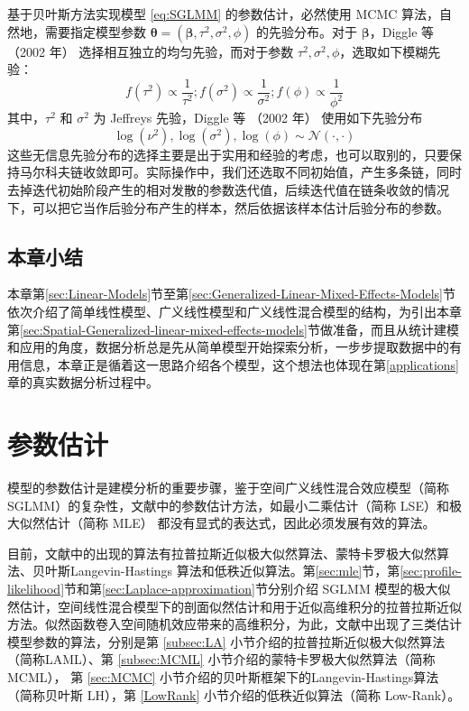 \documentclass[12pt,a4paper,UTF8,twoside]{book}
\theoremstyle{definition}
\theoremstyle{definition}
\theoremstyle{definition}
\theoremstyle{remark}
\begin{document}
基于贝叶斯方法实现模型 \eqref{eq:SGLMM} 的参数估计，必然使用 MCMC 算法，自然地，需要指定模型参数 \(\boldsymbol{\theta} = (\boldsymbol{\beta},\tau^2,\sigma^2,\phi)\) 的先验分布。对于 \(\boldsymbol{\beta}\)，Diggle 等 （2002 年） \citep{Diggle2002Childhood} 选择相互独立的均匀先验，而对于参数 \(\tau^2,\sigma^2,\phi\)，选取如下模糊先验：
\[f(\tau^2) \propto \frac{1}{\tau^2};f(\sigma^2) \propto \frac{1}{\sigma^2};f(\phi) \propto \frac{1}{\phi^2}\]
\noindent 其中，\(\tau^2\) 和 \(\sigma^2\) 为 Jeffreys 先验，Diggle 等 （2002 年） \citep{Diggle2002Childhood} 使用如下先验分布
\begin{equation*}
\log(\nu^2),\log(\sigma^2),\log(\phi)  \sim \mathcal{N}(\cdot,\cdot)
\end{equation*}
这些无信息先验分布的选择主要是出于实用和经验的考虑，也可以取别的，只要保持马尔科夫链收敛即可。实际操作中，我们还选取不同初始值，产生多条链，同时去掉迭代初始阶段产生的相对发散的参数迭代值，后续迭代值在链条收敛的情况下，可以把它当作后验分布产生的样本，然后依据该样本估计后验分布的参数。

\hypertarget{sec:models}{%
\section{本章小结}\label{sec:models}}

本章第\ref{sec:Linear-Models}节至第\ref{sec:Generalized-Linear-Mixed-Effects-Models}节依次介绍了简单线性模型、广义线性模型和广义线性混合模型的结构，为引出本章第\ref{sec:Spatial-Generalized-linear-mixed-effects-models}节做准备，而且从统计建模和应用的角度，数据分析总是先从简单模型开始探索分析，一步步提取数据中的有用信息，本章正是循着这一思路介绍各个模型，这个想法也体现在第\ref{applications}章的真实数据分析过程中。

\hypertarget{algorithms}{%
\chapter{参数估计}\label{algorithms}}

模型的参数估计是建模分析的重要步骤，鉴于空间广义线性混合效应模型（简称 SGLMM）的复杂性，文献中的参数估计方法，如最小二乘估计（简称 LSE）和极大似然估计（简称 MLE） 都没有显式的表达式，因此必须发展有效的算法。

目前，文献中的出现的算法有拉普拉斯近似极大似然算法、蒙特卡罗极大似然算法、贝叶斯Langevin-Hastings 算法和低秩近似算法。第\ref{sec:mle}节，第\ref{sec:profile-likelihood}节和第\ref{sec:Laplace-approximation}节分别介绍 SGLMM 模型的极大似然估计，空间线性混合模型下的剖面似然估计和用于近似高维积分的拉普拉斯近似方法。似然函数卷入空间随机效应带来的高维积分，为此，文献中出现了三类估计模型参数的算法，分别是第 \ref{subsec:LA} 小节介绍的拉普拉斯近似极大似然算法（简称LAML）、第 \ref{subsec:MCML} 小节介绍的蒙特卡罗极大似然算法（简称 MCML）， 第 \ref{sec:MCMC} 小节介绍的贝叶斯框架下的Langevin-Hastings算法 （简称贝叶斯 LH），第 \ref{LowRank} 小节介绍的低秩近似算法（简称 Low-Rank）。
\end{document}
